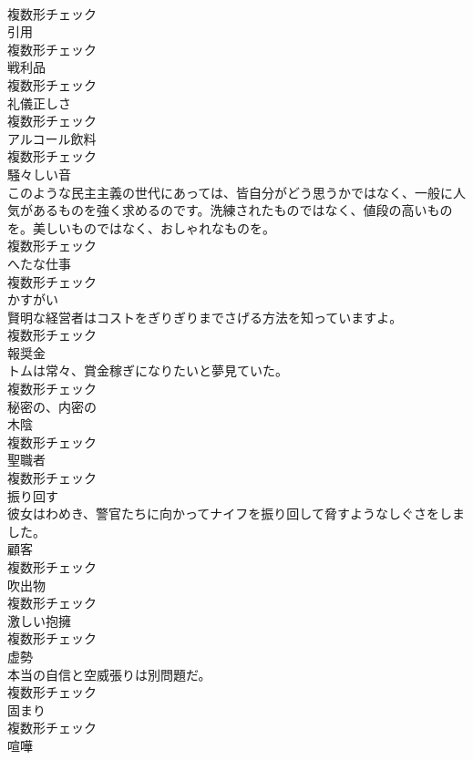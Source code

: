 \documentclass[8pt]{extreport}
\begin{document}
\begin{CJK}{UTF8}{min}
\\	複数形チェック
\\	[名詞]	引用	
\\	複数形チェック
\\	[名詞]	戦利品	
\\	複数形チェック
\\	[名詞]	礼儀正しさ	
\\	複数形チェック
\\	[名詞]	アルコール飲料	
\\	複数形チェック
\\	[名詞]	騒々しい音	
\\	このような民主主義の世代にあっては、皆自分がどう思うかではなく、一般に人気があるものを強く求めるのです。洗練されたものではなく、値段の高いものを。美しいものではなく、おしゃれなものを。	
\\	複数形チェック
\\	[名詞]	へたな仕事	
\\	複数形チェック
\\	[名詞]	かすがい	
\\	賢明な経営者はコストをぎりぎりまでさげる方法を知っていますよ。	
\\	複数形チェック
\\	[名詞]	報奨金	
\\	トムは常々、賞金稼ぎになりたいと夢見ていた。	
\\	複数形チェック
\\	[形容詞]	秘密の、内密の	
\\	[名詞]	木陰	
\\	複数形チェック
\\	[名詞]	聖職者	
\\	複数形チェック
\\	[動詞]	振り回す	
\\	彼女はわめき、警官たちに向かってナイフを振り回して脅すようなしぐさをしました。	
\\	[名詞]	顧客	
\\	複数形チェック
\\	[名詞]	吹出物	
\\	複数形チェック
\\	[名詞]	激しい抱擁	
\\	複数形チェック
\\	[名詞]	虚勢	
\\	本当の自信と空威張りは別問題だ。	
\\	複数形チェック
\\	[名詞]	固まり	
\\	複数形チェック
\\	[名詞]	喧嘩	

\end{CJK}
\end{document}
